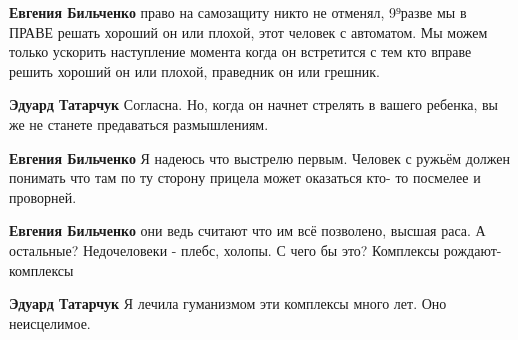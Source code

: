 \begin{itemize}
\begin{itemize}
 
\textbf{Евгения Бильченко} право на самозащиту никто не отменял, 9⁹разве мы в ПРАВЕ решать хороший он или плохой, этот человек с автоматом. Мы можем только ускорить наступление момента когда он встретится с тем кто вправе решить хороший он или плохой, праведник он или грешник.

 
\textbf{Эдуард Татарчук} Согласна. Но, когда он начнет стрелять в вашего ребенка, вы же не станете предаваться размышлениям.

 
\textbf{Евгения Бильченко} Я надеюсь что выстрелю первым. Человек с ружьём должен понимать что там по ту сторону прицела может оказаться кто- то посмелее и проворней.

 
\textbf{Евгения Бильченко} они ведь считают что им всё позволено, высшая раса. А остальные? Недочеловеки - плебс, холопы. С чего бы это?
Комплексы рождают- комплексы

 
\textbf{Эдуард Татарчук} Я лечила гуманизмом эти комплексы много лет. Оно неисцелимое.

 

\end{itemize}
\end{itemize}

